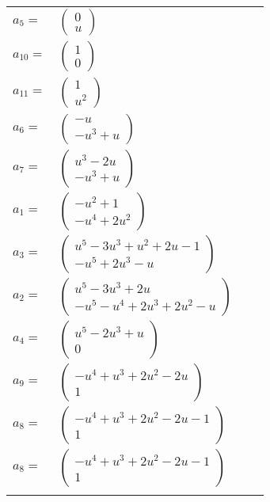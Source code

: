 \documentclass[1p]{elsarticle_modified}
\theoremstyle{definition}
\begin{document}
\begin{tabular}{m{7pt} m{180pt} m{7pt} m{180pt} }
\flushright $a_{5}=$&$\begin{pmatrix}0\\u\end{pmatrix}$ \\
\flushright $a_{10}=$&$\begin{pmatrix}1\\0\end{pmatrix}$ \\
\flushright $a_{11}=$&$\begin{pmatrix}1\\u^2\end{pmatrix}$ \\
\flushright $a_{6}=$&$\begin{pmatrix}- u\\- u^3+u\end{pmatrix}$ \\
\flushright $a_{7}=$&$\begin{pmatrix}u^3-2 u\\- u^3+u\end{pmatrix}$ \\
\flushright $a_{1}=$&$\begin{pmatrix}- u^2+1\\- u^4+2 u^2\end{pmatrix}$ \\
\flushright $a_{3}=$&$\begin{pmatrix}u^5-3 u^3+u^2+2 u-1\\- u^5+2 u^3- u\end{pmatrix}$ \\
\flushright $a_{2}=$&$\begin{pmatrix}u^5-3 u^3+2 u\\- u^5- u^4+2 u^3+2 u^2- u\end{pmatrix}$ \\
\flushright $a_{4}=$&$\begin{pmatrix}u^5-2 u^3+u\\0\end{pmatrix}$ \\
\flushright $a_{9}=$&$\begin{pmatrix}- u^4+u^3+2 u^2-2 u\\1\end{pmatrix}$ \\
\flushright $a_{8}=$&$\begin{pmatrix}- u^4+u^3+2 u^2-2 u-1\\1\end{pmatrix}$\\ \flushright $a_{8}=$&$\begin{pmatrix}- u^4+u^3+2 u^2-2 u-1\\1\end{pmatrix}$\\&\end{tabular}
\end{document}
